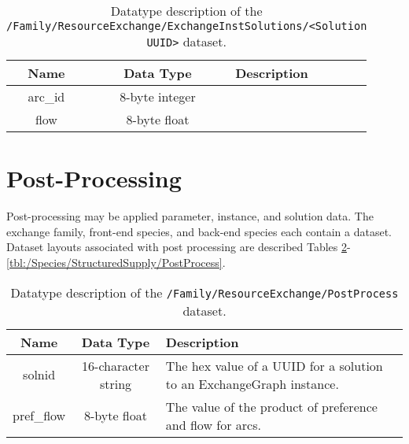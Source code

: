 \begin{table}[h!]
\centering
\caption{\label{tbl:/Family/ResourceExchange/ExchangeInstSolutions/id_2fa2ee6eb9654baf8780a99713dd5e69}
Datatype description of the \lstinline[basicstyle=\ttfamily\color{black}]|/Family/ResourceExchange/ExchangeInstSolutions/<Solution UUID>| dataset.}
\begin{tabularx}{\columnwidth-10pt}{|c|c|X|} %
\hline
\textbf{Name} & \textbf{Data Type} & \textbf{Description}       \\ \hline
arc\_id & 8-byte integer &  \\ \hline
flow & 8-byte float &  \\ \hline
\end{tabularx}
\end{table}

\section{Post-Processing}

Post-processing may be applied parameter, instance, and solution data. The
exchange family, front-end species, and back-end species each contain a
 dataset. Dataset layouts associated with post processing are
described Tables
\ref{tbl:/Family/ResourceExchange/PostProcess}-\ref{tbl:/Species/StructuredSupply/PostProcess}.

\begin{table}[h!]
\centering
\caption{\label{tbl:/Family/ResourceExchange/PostProcess}
Datatype description of the \lstinline[basicstyle=\ttfamily\color{black}]|/Family/ResourceExchange/PostProcess| dataset.}
\begin{tabularx}{\columnwidth-10pt}{|c|c|X|} %
\hline
\textbf{Name} & \textbf{Data Type} & \textbf{Description}       \\ \hline
solnid & 16-character string & The hex value of a UUID for a solution to an ExchangeGraph instance. \\ \hline
pref\_flow & 8-byte float & The value of the product of preference and flow for arcs. \\ \hline
\end{tabularx}
\end{table}

